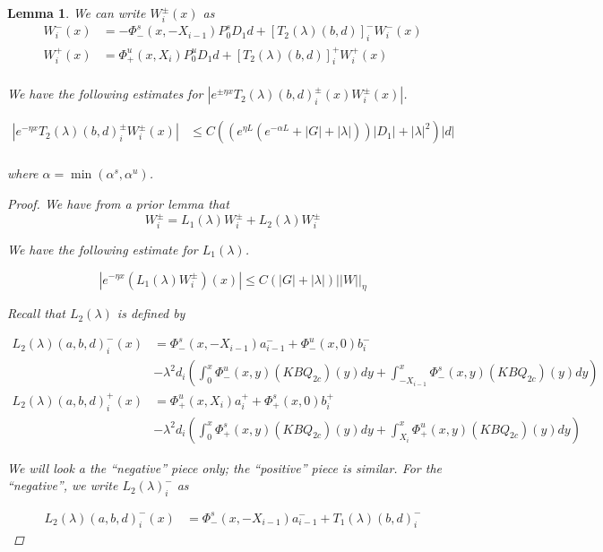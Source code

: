 \documentclass[12pt]{article}
\newtheorem{lemma}{Lemma}
\begin{document}
\begin{lemma}

We can write $W_i^\pm(x)$ as 
\begin{align*}
W_i^-(x) &= -\Phi^s_-(x, -X_{i-1}) P_0^s D_1 d + [T_2(\lambda)(b,d)]_i^- W_i^-(x)\\
W_i^+(x) &= \Phi^u_+(x, X_i) P_0^u D_1 d + [T_2(\lambda)(b,d)]_i^+ W_i^+(x)\\
\end{align*}

We have the following estimates for $|e^{\pm \eta x} T_2(\lambda)(b,d)_i^\pm(x) W_i^\pm(x)|$.

\begin{align*}
| e^{-\eta x} T_2(\lambda)(b,d)_i^\pm W_i^\pm(x) | &\leq C\left(\left( e^{\eta L}(e^{-\alpha L} + |G| + |\lambda|) \right)|D_1| + |\lambda|^2 \right) |d| \\
\end{align*}

where $\alpha = \min(\alpha^s, \alpha^u)$.

\begin{proof}
We have from a prior lemma that
\[
W_i^\pm = L_1(\lambda)W_i^\pm + L_2(\lambda)W_i^\pm 
\]

We have the following estimate for $L_1(\lambda)$.

\[
|e^{-\eta x} (L_1(\lambda) W_i^\pm)(x) | \leq C\left(|G| +|\lambda|\right)||W||_\eta
\]

Recall that $L_2(\lambda)$ is defined by

\begin{align*}
L_2(\lambda)(a, b, d)_i^-(x) &= \Phi^s_-(x, -X_{i-1})a^-_{i-1} + \Phi^u_-(x, 0)b_i^- \\
&- \lambda^2 d_i \left( \int_0^x \Phi^u_-(x, y)(KBQ_{2c})(y) dy  + \int_{-X_{i-1}}^x \Phi^s_-(x, y)(KBQ_{2c})(y) dy \right)\\
L_2(\lambda)(a, b, d)_i^+(x) &= \Phi^u_+(x, X_i)a^+_{i} + \Phi^s_+(x, 0)b_i^+ \\
&- \lambda^2 d_i \left( \int_0^x \Phi^s_+(x, y)(KBQ_{2c})(y) dy + \int_{X_{i}}^x \Phi^u_+(x, y)(KBQ_{2c})(y) dy \right)
\end{align*}

We will look a the ``negative'' piece only; the ``positive'' piece is similar. For the ``negative'', we write $L_2(\lambda)_i^-$ as 

\begin{align*}
L_2(\lambda)(a, b, d)_i^-(x) &= \Phi^s_-(x, -X_{i-1})a^-_{i-1} + T_1(\lambda)(b,d)_i^-
\end{align*}


\end{proof}
\end{lemma}
\end{document}
